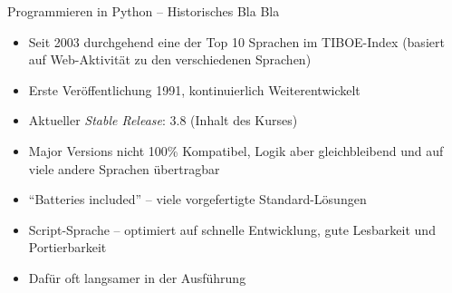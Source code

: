 
\begin{frame}{Programmieren in Python -- Historisches Bla Bla}
%
\begin{itemize}
\item Seit 2003 durchgehend eine der Top 10 Sprachen im TIBOE-Index (basiert auf Web-Aktivität zu den verschiedenen Sprachen)
\item Erste Veröffentlichung 1991, kontinuierlich Weiterentwickelt
\item Aktueller \emph{Stable Release}: 3.8 (Inhalt des Kurses)
\item Major Versions nicht 100\% Kompatibel, Logik aber gleichbleibend und auf viele andere Sprachen übertragbar
\item \enquote{Batteries included} -- viele vorgefertigte Standard-Lösungen
\item Script-Sprache -- optimiert auf schnelle Entwicklung, gute Lesbarkeit und Portierbarkeit
\item Dafür oft langsamer in der Ausführung
\end{itemize}
%
\end{frame}


